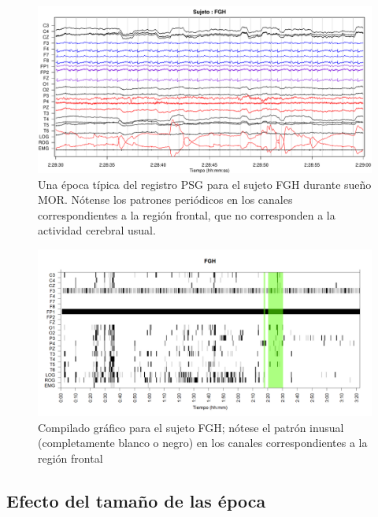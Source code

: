 \begin{figure}
\centering
\includegraphics[width=0.95\linewidth]
{./img_ejemplos/FGH_297_PDG_lucirse_PSG.pdf} 
\caption{Una época típica del registro PSG para el sujeto FGH durante sueño MOR. Nótense 
los patrones periódicos en los canales correspondientes a la región frontal, que no 
corresponden a la actividad cerebral usual.}
\label{FGH_psg}
\end{figure}

\begin{figure}
\centering
\includegraphics[width=0.95\linewidth]
{./img_ejemplos/FGHSUE_est.png} 
\caption{Compilado gráfico para el sujeto FGH; nótese el patrón inusual (completamente 
blanco o negro) en los canales correspondientes a la región frontal}
\label{FGH_especial}
\end{figure}


\subsection{Efecto del tamaño de las época}

